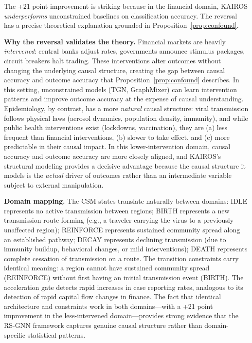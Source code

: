 \documentclass[11pt]{article}
\begin{document}
The +21 point improvement is striking because in the financial domain, KAIROS \emph{underperforms} unconstrained baselines on classification accuracy. The reversal has a precise theoretical explanation grounded in Proposition~\ref{prop:confound}.

\textbf{Why the reversal validates the theory.} Financial markets are heavily \emph{intervened}: central banks adjust rates, governments announce stimulus packages, circuit breakers halt trading. These interventions alter outcomes without changing the underlying causal structure, creating the gap between causal accuracy and outcome accuracy that Proposition~\ref{prop:confound} describes. In this setting, unconstrained models (TGN, GraphMixer) can learn intervention patterns and improve outcome accuracy at the expense of causal understanding. Epidemiology, by contrast, has a more \emph{natural} causal structure: viral transmission follows physical laws (aerosol dynamics, population density, immunity), and while public health interventions exist (lockdowns, vaccination), they are (a) less frequent than financial interventions, (b) slower to take effect, and (c) more predictable in their causal impact. In this lower-intervention domain, causal accuracy and outcome accuracy are more closely aligned, and KAIROS's structural modeling provides a decisive advantage because the causal structure it models is the \emph{actual} driver of outcomes rather than an intermediate variable subject to external manipulation.

\textbf{Domain mapping.} The CSM states translate naturally between domains: IDLE represents no active transmission between regions; BIRTH represents a new transmission route forming (e.g., a traveler carrying the virus to a previously unaffected region); REINFORCE represents sustained community spread along an established pathway; DECAY represents declining transmission (due to immunity buildup, behavioral changes, or mild interventions); DEATH represents complete cessation of transmission on a route. The transition constraints carry identical meaning: a region cannot have sustained community spread (REINFORCE) without first having an initial transmission event (BIRTH). The acceleration gate detects rapid increases in case reporting rates, analogous to its detection of rapid capital flow changes in finance. The fact that identical architecture and constraints work in both domains---with a +21 point improvement in the less-intervened domain---provides strong evidence that the RS-GNN framework captures genuine causal structure rather than domain-specific statistical patterns.
\end{document}
